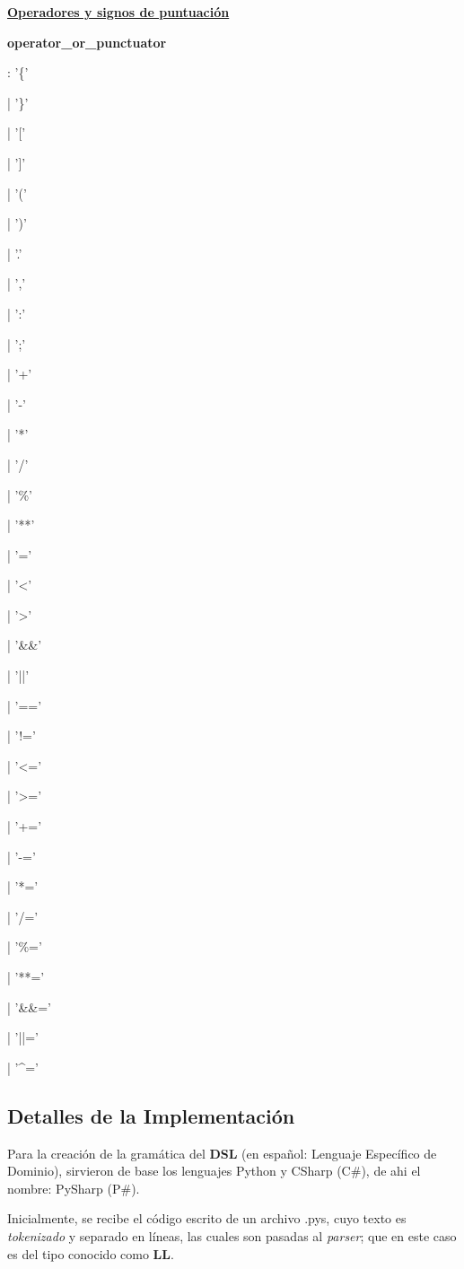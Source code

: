 \documentclass[12pt, letterpaper,spanish]{article}
\theoremstyle{definition}
\theoremstyle{remark}
\begin{document}
	\underline{\textbf{Operadores y signos de puntuación}}\par		
	\textbf{operator\_or\_punctuator}\par
	: '\{' \par
	| '\}' \par
	| '[' \par
	| ']' \par
	| '(' \par
	| ')' \par
	| '.' \par
	| ',' \par  
	| ':' \par
	| ';' \par
	| '+' \par
	| '-' \par
	| '*' \par
	| '/' \par
	| '\%' \par
	| '**' \par
	| '=' \par
	| '<' \par
	| '>' \par
	| '\&\&' \par
	| '||' \par
	| '==' \par
	| '!=' \par
	| '<=' \par
	| '>=' \par
	| '+=' \par
	| '-=' \par
	| '*=' \par
	| '/=' \par
	| '\%=' \par
	| '**=' \par
	| '\&\&=' \par
	| '||=' \par
	| '\textasciicircum{}=' \par
	
	\subsection{Detalles de la Implementación}
        Para la creación de la gramática del \textbf{DSL} (en español: Lenguaje Específico de Dominio), sirvieron de base los lenguajes Python y CSharp (C\#), de ahi el nombre: PySharp (P\#).

	Inicialmente, se recibe el código escrito de un archivo .pys, cuyo texto es \emph{tokenizado} y separado en líneas, las cuales son pasadas al \emph{parser}; que en este caso es del tipo conocido como \textbf{LL}.
\end{document}
